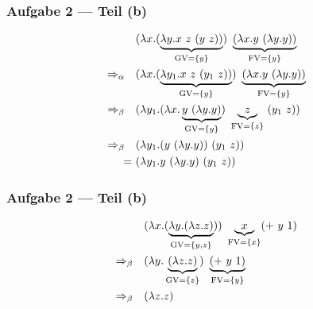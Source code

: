 \documentclass{beamer}
\DeclareMathOperator{\GV}{GV}
\DeclareMathOperator{\FV}{FV}
\begin{document}
\begin{frame} \frametitle{Aufgabe 2 --- Teil (b)}
	\begin{align*}
		&(\lambda x . (\underbrace{\lambda y . x \ z \ (y \ z))}_{\GV=\menge{y}}) \ \underbrace{(\lambda x . y \ (\lambda y . y))}_{\FV = \menge{y}}
		\\
		\Rightarrow_\alpha \quad
		& (\lambda x . (\underbrace{\lambda y_1 . x \ z \ (y_1 \ z))}_{\GV=\menge{y}}) \ \underbrace{(\lambda x . y \ (\lambda y . y))}_{\FV = \menge{y}}
		\\
		\Rightarrow_\beta \quad
		& (\lambda y_1 . (\lambda x . \underbrace{y \ (\lambda y . y)}_{\GV= \menge{y}}) \ \underbrace{z}_{\FV = \menge{z}} \ (y_1 \ z))
		\\
		\Rightarrow_\beta \quad
		& (\lambda y_1 . (y \ (\lambda y . y)) \ (y_1 \ z))
		\\
		= \ & (\lambda y_1 . y \ (\lambda y . y) \ (y_1 \ z))
	\end{align*}
\end{frame}


\begin{frame} \frametitle{Aufgabe 2 --- Teil (b)}
	\begin{align*}
		& (\lambda x . (\underbrace{\lambda y . (\lambda z . z)}_{\GV=\menge{y,z}})) \ \underbrace{x}_{\FV = \menge{x}} ( + \ y \ 1)
		\\
		\Rightarrow_\beta \quad
		& (\lambda y . \underbrace{(\lambda z . z)}_{\GV=\menge{z}}) \ \underbrace{( + \ y \ 1)}_{\FV = \menge{y}}
		\\
		\Rightarrow_\beta \quad
		& (\lambda z . z)
	\end{align*}
\end{frame}
\end{document}
